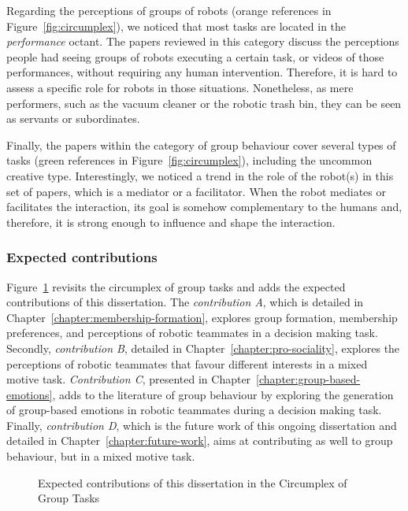Regarding the perceptions of groups of robots (orange references in Figure~\ref{fig:circumplex}), we noticed that most tasks are located in the \textit{performance} octant. The papers reviewed in this category discuss the perceptions people had seeing groups of robots executing a certain task, or videos of those performances, without requiring any human intervention. Therefore, it is hard to assess a specific role for robots in those situations. Nonetheless, as mere performers, such as the vacuum cleaner or the robotic trash bin, they can be seen as servants or subordinates.

Finally, the papers within the category of group behaviour cover several types of tasks (green references in Figure~\ref{fig:circumplex}), including the uncommon creative type. Interestingly, we noticed a trend in the role of the robot(s) in this set of papers, which is a mediator or a facilitator.
When the robot mediates or facilitates the interaction, its goal is somehow complementary to the humans and, therefore, it is strong enough to influence and shape the interaction.


\subsubsection{Expected contributions}

Figure~\ref{fig:circumplex-contributions} revisits the circumplex of group tasks and adds the expected contributions of this dissertation. The \textit{contribution A}, which is detailed in Chapter~\ref{chapter:membership-formation}, explores group formation, membership preferences, and perceptions of robotic teammates in a decision making task. Secondly, \textit{contribution B}, detailed in Chapter~\ref{chapter:pro-sociality}, explores the perceptions of robotic teammates that favour different interests in a mixed motive task. \textit{Contribution C}, presented in Chapter~\ref{chapter:group-based-emotions}, adds to the literature of group behaviour by exploring the generation of group-based emotions in robotic teammates during a decision making task. Finally, \textit{contribution D}, which is the future work of this ongoing dissertation and detailed in Chapter~\ref{chapter:future-work}, aims at contributing as well to group behaviour, but in a mixed motive task.

\begin{figure}
    \centering
    
    \caption{Expected contributions of this dissertation in the Circumplex of Group Tasks \cite{mcgrath1995methodology}}
    \label{fig:circumplex-contributions}
\end{figure}





